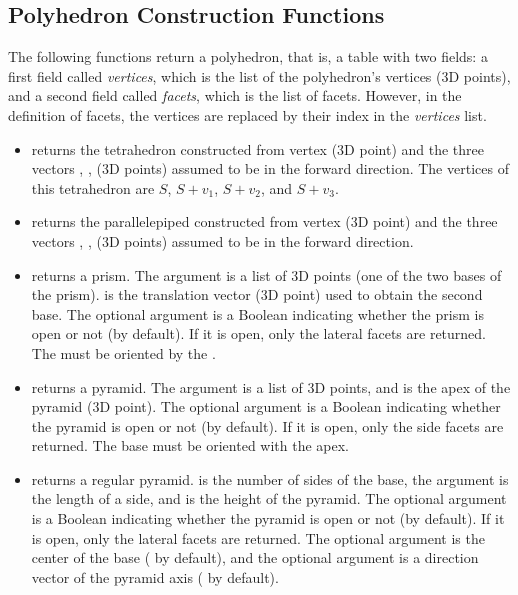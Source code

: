 \subsection{Polyhedron Construction Functions}

The following functions return a polyhedron, that is, a table with two fields: a first field called \emph{vertices}, which is the list of the polyhedron's vertices (3D points), and a second field called \emph{facets}, which is the list of facets. However, in the definition of facets, the vertices are replaced by their index in the \emph{vertices} list.

\begin{itemize}
    \item {} returns the tetrahedron constructed from vertex  (3D point) and the three vectors , ,  (3D points) assumed to be in the forward direction. The vertices of this tetrahedron are $S$, $S+v_1$, $S+v_2$, and $S+v_3$.

    \item {} returns the parallelepiped constructed from vertex  (3D point) and the three vectors , ,  (3D points) assumed to be in the forward direction.

    \item {} returns a prism. The argument  is a list of 3D points (one of the two bases of the prism).  is the translation vector (3D point) used to obtain the second base. The optional argument  is a Boolean indicating whether the prism is open or not (\false by default). If it is open, only the lateral facets are returned. The  must be oriented by the .

    \item {} returns a pyramid. The argument  is a list of 3D points, and  is the apex of the pyramid (3D point). The optional argument  is a Boolean indicating whether the pyramid is open or not (\false by default). If it is open, only the side facets are returned. The base must be oriented with the apex.

    \item {} returns a regular pyramid.  is the number of sides of the base, the argument  is the length of a side, and  is the height of the pyramid. The optional argument  is a Boolean indicating whether the pyramid is open or not (\false by default). If it is open, only the lateral facets are returned. The optional argument  is the center of the base ( by default), and the optional argument  is a direction vector of the pyramid axis ( by default).


\end{itemize}
